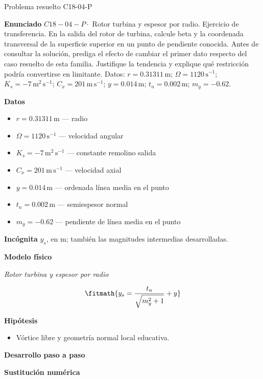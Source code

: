 \documentclass[10pt,openany]{book}
\begin{document}
\begin{studiumworked}{Problema resuelto C18-04-P}


\noindent\textbf{Enunciado}
\(C18-04-P \cdot\) Rotor turbina y espesor por radio. Ejercicio de transferencia. En la salida del rotor de turbina, calcule beta y la coordenada transversal de la superficie superior en un punto de pendiente conocida. Antes de consultar la solución, prediga el efecto de cambiar el primer dato respecto del caso resuelto de esta familia. Justifique la tendencia y explique qué restricción podría convertirse en limitante. Datos: \(r=0.31311\, \mathrm{m}\); \(\Omega=1120\, \mathrm{s}^{-1}\); \(K_s=-7\, \mathrm{m}^{2}\,\mathrm{s}^{-1}\); \(C_x=201\, \mathrm{m}\,\mathrm{s}^{-1}\); \(y=0.014\, \mathrm{m}\); \(t_n=0.002\, \mathrm{m}\); \(m_y=-0.62\).

\noindent\textbf{Datos}
\begin{itemize}
\item $r = 0.31311\,\mathrm{m}$ — radio
\item $\Omega = 1120\,\mathrm{s}^{-1}$ — velocidad angular
\item $K_s = -7\,\mathrm{m}^{2}\,\mathrm{s}^{-1}$ — constante remolino salida
\item $C_x = 201\,\mathrm{m}\,\mathrm{s}^{-1}$ — velocidad axial
\item $y = 0.014\,\mathrm{m}$ — ordenada línea media en el punto
\item $t_n = 0.002\,\mathrm{m}$ — semiespesor normal
\item $m_y = -0.62$ — pendiente de línea media en el punto
\end{itemize}

\noindent\textbf{Incógnita}
$y_s$, en $\mathrm{m}$; también las magnitudes intermedias desarrolladas.

\noindent\textbf{Modelo físico}

\noindent\textit{Rotor turbina y espesor por radio}

\[
\fitmath{y_s=\frac{t_n}{\sqrt{m_y^{2} + 1}} + y}
\]

\noindent\textbf{Hipótesis}
\begin{itemize}
\item Vórtice libre y geometría normal local educativa.
\end{itemize}

\noindent\textbf{Desarrollo paso a paso}



\noindent\textbf{Sustitución numérica}


\end{studiumworked}
\end{document}
